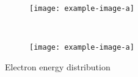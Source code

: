 \begin{figure}[!ht]
	\begin{subfigure}{0.5\textwidth}
		\texttt{[image: example-image-a]}
		\caption{}
		\label{}
	\end{subfigure}
	~
	\begin{subfigure}{0.5\textwidth}
		\texttt{[image: example-image-a]}
		\caption{}
		\label{}
	\end{subfigure}
	\caption[]{Electron energy distribution}
	\label{chap3:garfieldangle}
\end{figure}
